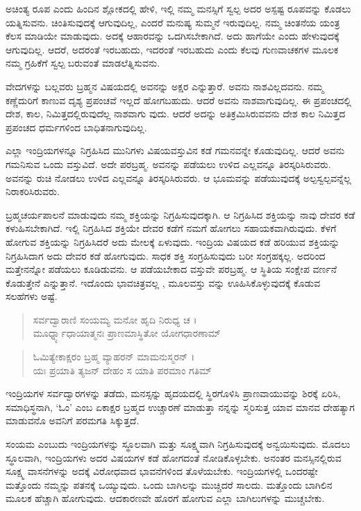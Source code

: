 ಅಚಿಂತ್ಯ ರೂಪ ಎಂದು ಹಿಂದಿನ ಶ್ಲೋಕದಲ್ಲಿ ಹೇಳಿ, ಇಲ್ಲಿ ನಮ್ಮ ಮನಸ್ಸಿಗೆ ಸ್ವಲ್ಪ ಅದರ ಅಸ್ಪಷ್ಟ ರೂಪವನ್ನು ಕೊಡಲು ಯತ್ನಿಸುವನು. ಚಿಂತಿಸುವುದಕ್ಕೆ ಆಗುವುದಿಲ್ಲ, ಎಂದರೆ ಮನುಷ್ಯ ಸುಮ್ಮನೆ ಇರುವುದಿಲ್ಲ. ನಮ್ಮ ಚಿಂತನೆಯ ಯಂತ್ರ ಕೆಲಸ ಮಾಡಿಯೇ ಮಾಡುವುದು. ಅದಕ್ಕೆ ಆಹಾರವನ್ನು ಒದಗಿಸಬೇಕಾಗಿದೆ. ಅದು ಹಾಗೆಯೇ ಎಂದು ಹೇಳುವುದಕ್ಕೆ ಆಗುವುದಿಲ್ಲ. ಆದರೆ, ಅದರಂತೆ ಇರಬಹುದು, ಇದರಂತೆ ಇರಬಹುದು ಎಂದು ಕೆಲವು ಗುಣವಾಚಕಗಳ ಮೂಲಕ ನಮ್ಮ ಗ್ರಹಿಕೆಗೆ ಸ್ವಲ್ಪ ಬರುವಂತೆ ಮಾಡಲೆತ್ನಿಸುವನು.

ವೇದಗಳನ್ನು ಬಲ್ಲವರು ಬ್ರಹ್ಮನ ವಿಷಯದಲ್ಲಿ ಅವನನ್ನು ಅಕ್ಷರ ಎನ್ನುತ್ತಾರೆ. ಅವನು ನಾಶವಿಲ್ಲದವನು. ನಮ್ಮ ಕಣ್ಣೆದುರಿಗೆ ಕಾಣುವ ದೃಶ್ಯ ಪ್ರಪಂಚವೆ ಇಲ್ಲದೆ ಹೋಗಬಹುದು. ಆದರೆ ಅವನು ನಾಶವಾಗುವುದಿಲ್ಲ. ಈ ಪ್ರಪಂಚದಲ್ಲಿ ದೇಶ, ಕಾಲ, ನಿಮಿತ್ತದಲ್ಲಿರುವುದೆಲ್ಲ ನಾಶವಾಗು ವುದು. ಆದರೆ ಅದನ್ನು ಅತಿಕ್ರಮಿಸಿರುವವನು ದೇಶ ಕಾಲ ನಿಮಿತ್ತದ ಪ್ರಪಂಚದ ಧರ್ಮಗಳಿಂದ ಬಾಧಿತನಾಗುವುದಿಲ್ಲ.

ಎಲ್ಲಾ ಇಂದ್ರಿಯಗಳನ್ನೂ ನಿಗ್ರಹಿಸಿದ ಮುನಿಗಳು ವಿಷಯವಸ್ತುವಿನ ಕಡೆ ಗಮನವನ್ನೇ ಕೊಡುವುದಿಲ್ಲ. ಆದರೆ ಅವನು ಗಮನಿಸುವ ಒಂದು ವಸ್ತುವಿದೆ. ಅದೇ ಪರಬ್ರಹ್ಮ. ಅವನನ್ನು ಪಡೆಯಲು ಉಳಿದ ಎಲ್ಲವನ್ನೂ ತಿರಸ್ಕರಿಸಿರುವರು. ಅವನನ್ನು ರುಚಿ ನೋಡಲು ಉಳಿದ ಎಲ್ಲವನ್ನೂ ತಿರಸ್ಕರಿಸಿರುವರು. ಆ ಭೂಮವನ್ನು ಪಡೆಯುವುದಕ್ಕೆ ಅಲ್ಪಸ್ವಲ್ಪವನ್ನೆಲ್ಲ ನಿರಾಕರಿಸಿರುವರು.

ಬ್ರಹ್ಮಚರ್ಯಪಾಲನೆ ಮಾಡುವುದು ನಮ್ಮ ಶಕ್ತಿಯನ್ನು ನಿಗ್ರಹಿಸುವುದಕ್ಕಾಗಿ. ಆ ನಿಗ್ರಹಿಸಿದ ಶಕ್ತಿಯನ್ನು ನಾವು ದೇವರ ಕಡೆ ಕಳುಹಿಸಬೇಕಾಗಿದೆ. ಇಲ್ಲಿ ನಿಗ್ರಹಿಸಿದ ಶಕ್ತಿಯೇ ದೇವರ ಕಡೆಗೆ ನಮಗೆ ಹೋಗಲು ಸಹಾಯಕವಾಗಿರುವುದು. ಕೆಳಗೆ ಹೋಗುವ ಶಕ್ತಿಯನ್ನು ನಿಗ್ರಹಿಸಿದರೆ ಅದು ಮೇಲಕ್ಕೆ ಏಳುವುದು. ಇಂದ್ರಿಯ ವಿಷಯದ ಕಡೆ ಹರಿಯುವ ಶಕ್ತಿಯನ್ನು ನಿಗ್ರಹಿಸಿದಾಗ ಅದು ದೇವರ ಕಡೆ ಹೋಗುವುದು. ಸಾಧಕ ಶಕ್ತಿ ಸಂಗ್ರಹಿಸುವುದು ಬರೀ ಸಂಗ್ರಹಕ್ಕಲ್ಲ. ಅದರಿಂದ ಮತ್ತೇನನ್ನೋ ಪಡೆಯಲು ಕೂಡಿಡುವನು. ಆ ಪಡೆಯಬೇಕಾದ ವಸ್ತುವೇ ಪರಬ್ರಹ್ಮ. ಆ ಸ್ಥಿತಿಯ ಸಂಕ್ಷೇಪ ವರ್ಣನೆ ಕೊಡುತ್ತೇನೆ ಎನ್ನುತ್ತಾನೆ. ಇದೊಂದು ಭಾವಚಿತ್ರವಲ್ಲ , ಮೂಲವಸ್ತು ವನ್ನು ಊಹಿಸಿಕೊಳ್ಳುವುದಕ್ಕೆ ಕೊಡುವ ಸಲಹೆಗಳು ಅಷ್ಟೆ.

\begin{verse}
ಸರ್ವದ್ವಾರಾಣಿ ಸಂಯಮ್ಯ ಮನೋ ಹೃದಿ ನಿರುಧ್ಯ ಚ ।\\ಮೂರ್ಧ್ನ್ಯಾಧಾಯಾತ್ಮನಃ ಪ್ರಾಣಮಾಸ್ಥಿತೋ ಯೋಗಧಾರಣಾಮ್ 
\end{verse}

\begin{verse}
ಓಮಿತ್ಯೇಕಾಕ್ಷರಂ ಬ್ರಹ್ಮ ವ್ಯಾಹರನ್ ಮಾಮನುಸ್ಮರನ್ ।\\ಯಃ ಪ್ರಯಾತಿ ತ್ಯಜನ್ ದೇಹಂ ಸ ಯಾತಿ ಪರಮಾಂ ಗತಿಮ್ 
\end{verse}

{\small ಇಂದ್ರಿಯಗಳ ಸರ್ವದ್ವಾರಗಳನ್ನು ತಡೆದು, ಮನಸ್ಸನ್ನು ಹೃದಯದಲ್ಲಿ ಸ್ಥಿರಗೊಳಿಸಿ ಪ್ರಾಣವಾಯುವನ್ನು ಶಿರಕ್ಕೆ ಏರಿಸಿ, ಸಮಾಧಿಸ್ಥನಾಗಿ, ‘ಓಂ’ ಎಂಬ ಏಕಾಕ್ಷರ ಬ್ರಹ್ಮದ ಉಚ್ಚಾರಣೆ ಮಾಡುತ್ತಾ ನನ್ನನ್ನು ಸ್ಮರಿಸುತ್ತ ಯಾವ ಮಾನವ ದೇಹತ್ಯಾಗ ಮಾಡುವನೊ ಅವನಿಗೆ ಪರಮಗತಿ ಸಿಕ್ಕುತ್ತದೆ.}

ಸಂಯಮ ಎಂಬುದು ಇಂದ್ರಿಯಗಳನ್ನು ಸ್ಥೂಲವಾಗಿ ಮತ್ತು ಸೂಕ್ಷ್ಮವಾಗಿ ನಿಗ್ರಹಿಸುವುದಕ್ಕೆ ಅನ್ವಯಿಸುವುದು. ಮೊದಲು ಸ್ಥೂಲವಾಗಿ, ಇಂದ್ರಿಯಗಳು ಅದರ ವಿಷಯಗಳ ಕಡೆ ಹೋಗದಂತೆ ನೋಡಿಕೊಳ್ಳಬೇಕು. ಅನಂತರ ಮನಸ್ಸಿನಲ್ಲಿರುವ ಸೂಕ್ಷ್ಮ ವಾಸನೆಗಳನ್ನು ಅದಕ್ಕೆ ವಿರೋಧವಾದ ಭಾವನೆಗಳಿಂದ ತೊಳೆಯಬೇಕು. ಇಂದ್ರಿಯಗಳಲ್ಲಿ ಒಂದರಷ್ಟೇ ಮತ್ತೊಂದು ನಮ್ಮನ್ನು ಪತನಕ್ಕೆ ಒಯ್ಯುವುದು. ಒಂದು ಬಾಗಿಲನ್ನು ಮುಚ್ಚಿದರೆ ಸಾಲದು. ಮತ್ತೊಂದು ಬಾಗಿಲಿನ ಮೂಲಕ ಹೆಚ್ಚಾಗಿ ಹೋಗುವುದು. ಆದಕಾರಣವೇ ಹೊರಗೆ ಹೋಗುವ ಎಲ್ಲಾ ಬಾಗಿಲುಗಳನ್ನು ಮುಚ್ಚಬೇಕು.

